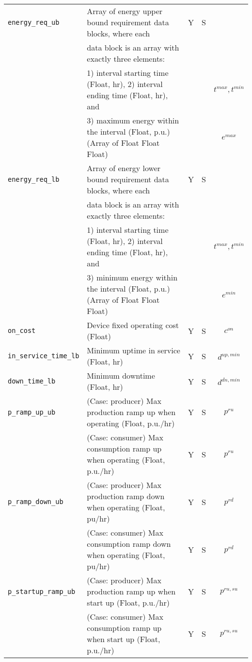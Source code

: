 \documentclass{article}
\begin{document}
\begin{center}
\begin{tabular}{ l | l | c | c | c |}
  {\tt energy\_req\_ub} & Array of energy upper bound requirement data blocks, where each & Y & S & \\
                        & data block is an array with exactly three elements: &   &   & \\
                        & 1) interval starting time (Float, hr), 2) interval ending time (Float, hr), and &   &   & { $t^{max}, t^{min}$}\\
                        & 3) maximum energy within the interval (Float, p.u.) (Array of Float Float Float) &   &   & { $e^{max}$ }\\
  {\tt energy\_req\_lb} & Array of energy lower bound requirement data blocks, where each & Y & S &  \\
                        & data block is an array with exactly three elements: &   &   & \\
                        & 1) interval starting time (Float, hr), 2) interval ending time (Float, hr), and &   &   & { $t^{max}, t^{min}$}\\
                        & 3) minimum energy within the interval (Float, p.u.) (Array of Float Float Float) &   &   & { $e^{min}$}\\                               
  {\tt on\_cost} & Device fixed operating cost (Float) & Y & S & $c^{on}$\\
  {\tt in\_service\_time\_lb} & Minimum uptime in service (Float, hr) & Y & S & $d^{up,min}$\\
  {\tt down\_time\_lb} & Minimum downtime (Float, hr) & Y & S & $d^{dn,min}$\\
  {\tt p\_ramp\_up\_ub}     & {(Case: producer) Max production ramp up when operating (Float, p.u./hr)} & Y & S & $p^{ru}$ \\
                            & {(Case: consumer) Max consumption ramp up when operating (Float, p.u./hr)} & Y & S & $p^{ru}$ \\
  {\tt p\_ramp\_down\_ub}   & {(Case: producer) Max production ramp down when operating (Float, pu/hr)} & Y & S & $p^{rd}$ \\
                            & {(Case: consumer) Max consumption ramp down when operating (Float, pu/hr)} & Y & S & $p^{rd}$ \\
  {\tt p\_startup\_ramp\_ub} & {(Case: producer) Max production ramp up when start up (Float, p.u./hr)} & Y & S & $p^{ru,su}$\\
                             & {(Case: consumer) Max consumption ramp up when start up (Float, p.u./hr)} & Y & S & $p^{ru,su}$\\

\end{tabular}
\end{center}
\end{document}
